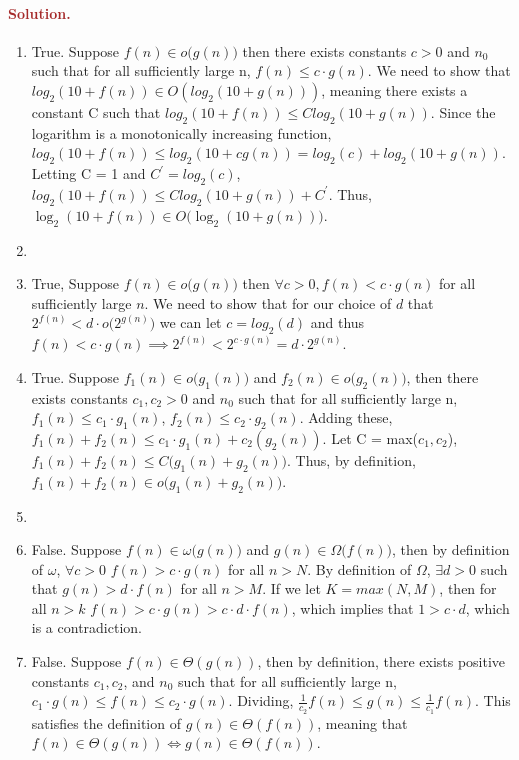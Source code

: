 \paragraph{\textcolor{brown}{Solution.}}
\begin{enumerate}
    \item True. Suppose $f(n) \in o\big(g(n)\big)$ then there exists constants $c > 0$ and $n_0$ such that for all sufficiently large n, $f(n) \le c \cdot g(n)$. We need to show that $log_2(10 + f(n)) \in O(log_2(10 + g(n)))$, meaning there exists a constant C such that $log_2(10+f(n)) \le Clog_2(10+g(n))$. Since the logarithm is a monotonically increasing function, $log_2(10+f(n)) \le log_2(10+cg(n)) = log_2(c) + log_2(10+g(n))$. Letting C = 1 and $C^\prime = log_2(c)$, $log_2(10+f(n)) \le Clog_2(10+g(n)) + C^\prime$. Thus, $\log_2 (10 + f(n)) \in O\big(\log_2 (10 + g(n))\big)$.
    \item 
    \item True, Suppose $f(n) \in o\big(g(n)\big)$ then $\forall c > 0 , f(n) < c \cdot g(n)$ for all sufficiently large $n$. We need to show that for our choice of $d$ that $2^{f(n)} < d \cdot o\big(2^{g(n)}\big)$ we can let $c = log_2(d)$ and thus $f(n) < c \cdot g(n) \implies 2^{f(n)} < 2^{c \cdot g(n)} = d \cdot 2^{g(n)}$.
    \item True. Suppose $f_1(n) \in o\big(g_1(n))$ and $f_2(n) \in o\big(g_2(n))$, then there exists constants $c_1, c_2 > 0$ and $n_0$ such that for all sufficiently large n, $f_1(n) \le c_1 \cdot g_1(n)$, $f_2(n) \le c_2 \cdot g_2(n)$. Adding these, $f_1(n) + f_2(n) \le c_1 \cdot g_1(n) + c_2(g_2(n))$. Let C = max($c_1, c_2$), $f_1(n) + f_2(n) \le C(g_1(n) + g_2(n)\big)$. Thus, by definition, $f_1(n) + f_2(n) \in o\big(g_1(n) + g_2(n)\big)$.
    \item
    \item False. Suppose $f(n) \in \omega(g(n)\big)$ and $g(n) \in \Omega\big(f(n)\big)$, then by definition of $\omega$, $\forall c >0$ $f(n) > c \cdot g(n)$ for all $n > N$. By definition of $\Omega$, $\exists d > 0$ such that $g(n) > d \cdot f(n)$ for all $n > M$. If we let $K = max(N,M)$, then for all $n > k$ $f(n) > c \cdot g(n) > c \cdot d \cdot f(n)$, which implies that $1 > c \cdot d$, which is a contradiction.
    \item False. Suppose $f(n) \in \Theta(g(n))$, then by definition, there exists positive constants $c_1, c_2$, and $n_0$ such that for all sufficiently large n, $c_1 \cdot g(n) \le f(n) \le c_2 \cdot g(n)$. Dividing, $\frac{1}{c_2} f(n) \le g(n) \le \frac{1}{c_1} f(n)$. This satisfies the definition of $g(n) \in \Theta(f(n))$, meaning that $f(n) \in \Theta(g(n)) \iff g(n) \in \Theta(f(n))$.  
\end{enumerate}

